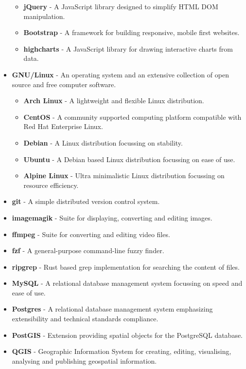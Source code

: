 \begin{itemize}
\begin{itemize}
      \item \textbf{jQuery} - A JavaScript library designed to simplify HTML DOM manipulation.
      \item \textbf{Bootstrap} - A framework for building responsive, mobile first websites.
      \item \textbf{highcharts} - A JavaScript library for drawing interactive charts from data.
    \end{itemize}
  \item \textbf{GNU/Linux} - An operating system and an extensive collection of open source and free computer software.
    \begin{itemize}
      \item \textbf{Arch Linux} - A lightweight and flexible Linux distribution.
      \item \textbf{CentOS} - A community supported computing platform compatible with Red Hat Enterprise Linux.
      \item \textbf{Debian} - A Linux distribution focussing on stability. 
      \item \textbf{Ubuntu} - A Debian based Linux distribution focussing on ease of use.
      \item \textbf{Alpine Linux} - Ultra minimalistic Linux distribution focussing on resource efficiency.
    \end{itemize}
  \item \textbf{git} - A simple distributed version control system.
  \item \textbf{imagemagik} - Suite for displaying, converting and editing images.
  \item \textbf{ffmpeg} - Suite for converting and editing video files.
  \item \textbf{fzf} - A general-purpose command-line fuzzy finder.
  \item \textbf{ripgrep} - Rust based grep implementation for searching the content of files.
  \item \textbf{MySQL} - A relational database management system focussing on speed and ease of use.
  \item \textbf{Postgres} - A relational database management system emphasizing extensibility and technical standards compliance.
  \item \textbf{PostGIS} - Extension providing spatial objects for the PostgreSQL database.
  \item \textbf{QGIS} - Geographic Information System for creating, editing, visualising, analysing and publishing geospatial information.

\end{itemize}
